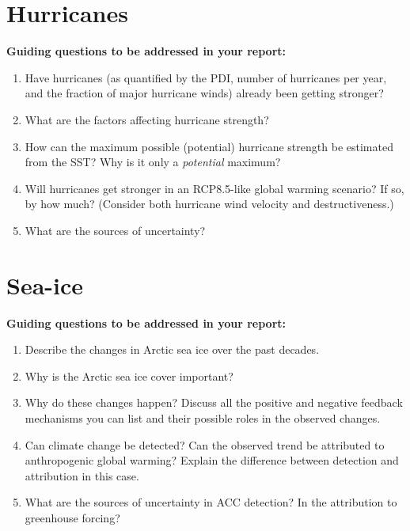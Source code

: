 \documentclass[12pt]{article}
\begin{document}
\section*{Hurricanes}
  \textbf{Guiding questions to be addressed in your report:}
    \begin{enumerate}
    \item Have hurricanes (as quantified by the PDI, number of hurricanes per year, and the fraction of major hurricane winds) already been getting stronger?
    \item What are the factors affecting hurricane strength?
    \item How can the maximum possible (potential) hurricane strength be estimated from the SST\@? Why is it only a {\textit{potential}} maximum?
    \item Will hurricanes get stronger in an RCP8.5-like global warming scenario? If so, by how much? (Consider both hurricane wind velocity and destructiveness.)
    \item What are the sources of uncertainty?
    \end{enumerate}

\section*{Sea-ice}
  \textbf{Guiding questions to be addressed in your report:}
    \begin{enumerate}
    \item  Describe the changes in Arctic sea ice over the past decades.
    \item Why is the Arctic sea ice cover important?
    \item Why do these changes happen? Discuss all the positive and negative feedback mechanisms you can list and their possible roles in the observed changes.
    \item Can climate change be detected? Can the observed trend be attributed to anthropogenic global warming? Explain the difference between detection and attribution in this case.
    \item What are the sources of uncertainty in ACC detection? In the attribution to greenhouse forcing?
    \end{enumerate}
\end{document}
